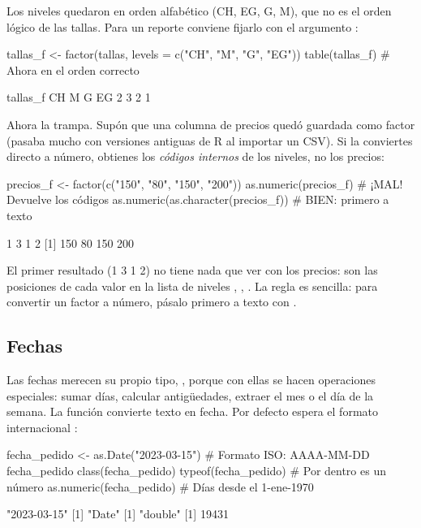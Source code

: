 Los niveles quedaron en orden alfabético (CH, EG, G, M), que no es el orden
lógico de las tallas. Para un reporte conviene fijarlo con el argumento
:

\begin{rcode}
tallas_f <- factor(tallas, levels = c("CH", "M", "G", "EG"))
table(tallas_f)                       # Ahora en el orden correcto
\end{rcode}
\begin{rsalida}
tallas_f
CH  M  G EG 
 2  3  2  1 
\end{rsalida}

Ahora la trampa. Supón que una columna de precios quedó guardada como factor
(pasaba mucho con versiones antiguas de R al importar un CSV). Si la
conviertes directo a número, obtienes los \emph{códigos internos} de los
niveles, no los precios:

\begin{rcode}
precios_f <- factor(c("150", "80", "150", "200"))
as.numeric(precios_f)                 # ¡MAL! Devuelve los códigos
as.numeric(as.character(precios_f))   # BIEN: primero a texto
\end{rcode}
\begin{rsalida}
[1] 1 3 1 2
[1] 150  80 150 200
\end{rsalida}

El primer resultado (1 3 1 2) no tiene nada que ver con los precios: son las
posiciones de cada valor en la lista de niveles ,
, . La regla es sencilla: para convertir un
factor a número, pásalo primero a texto con .

\subsection{Fechas}

Las fechas merecen su propio tipo, , porque con ellas se hacen
operaciones especiales: sumar días, calcular antigüedades, extraer el mes o
el día de la semana. La función  convierte texto en fecha.
Por defecto espera el formato internacional :

\begin{rcode}
fecha_pedido <- as.Date("2023-03-15")     # Formato ISO: AAAA-MM-DD
fecha_pedido
class(fecha_pedido)
typeof(fecha_pedido)                      # Por dentro es un número
as.numeric(fecha_pedido)                  # Días desde el 1-ene-1970
\end{rcode}
\begin{rsalida}
[1] "2023-03-15"
[1] "Date"
[1] "double"
[1] 19431
\end{rsalida}

